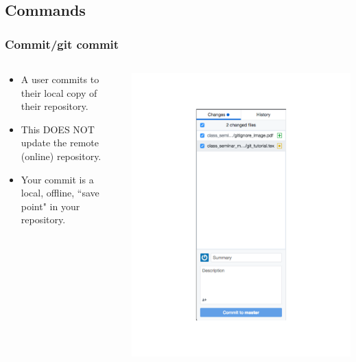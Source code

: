 \documentclass[]{beamer}
\begin{document}
\subsection{Commands}
\begin{frame}[t]\frametitle{Commit/git commit}
\begin{columns}
\begin{column}{.6\textwidth}
\begin{block}{} 
\begin{itemize}
  \item A user commits to their local copy of their repository. 
  \item This DOES NOT update the remote (online) repository.
  \item Your commit is a local, offline, ``save point" in your repository.
  \end{itemize}
\end{block}
\end{column}

\begin{column}{0.38\textwidth}
\centering
\includegraphics[scale = 0.30,trim={2.49in 1.39in 2.49in 1.39in},clip]{figures/commit_image.pdf}
\end{column}
\end{columns}

\end{frame}
\end{document}
